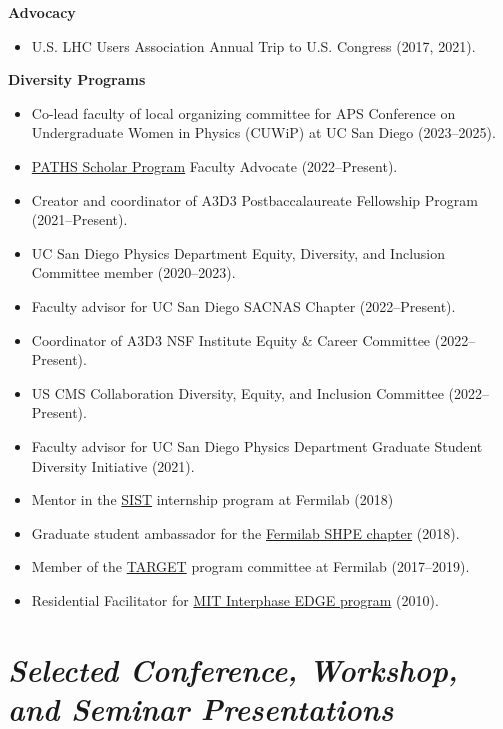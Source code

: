 \documentclass[11pt]{res}
\newcommand{\MarginText}[1]{\section{\textit{#1}}}
\begin{document}
\begin{resume}
  \textbf{Advocacy}
  \begin{itemize}
    \itemsep-0.3em
    \item U.S. LHC Users Association Annual Trip to U.S. Congress ({2017, 2021}).
  \end{itemize}

  \textbf{Diversity Programs}
  \begin{itemize}
    \itemsep-0.3em
    \item Co-lead faculty of local organizing committee for APS Conference on Undergraduate Women in Physics (CUWiP) at UC San Diego (2023--2025).
    \item \href{https://paths.ucsd.edu/index.html}{PATHS Scholar Program} Faculty Advocate (2022--Present).
    \item Creator and coordinator of A3D3 Postbaccalaureate Fellowship Program (2021--Present).
    \item UC San Diego Physics Department Equity, Diversity, and Inclusion Committee member ({2020--2023}).
    \item Faculty advisor for UC San Diego SACNAS Chapter ({2022--Present}).
    \item Coordinator of A3D3 NSF Institute Equity \& Career Committee ({2022--Present}).
    \item US CMS Collaboration Diversity, Equity, and Inclusion Committee ({2022--Present}).
    \item Faculty advisor for UC San Diego Physics Department Graduate Student Diversity Initiative ({2021}).
    \item Mentor in the \href{http://diversity.fnal.gov/sist/}{SIST} internship program at Fermilab ({2018})
    \item Graduate student ambassador for the \href{http://diversity.fnal.gov/fshpe/}{Fermilab SHPE chapter} ({2018}).
    \item Member of the \href{http://diversity.fnal.gov/target/}{TARGET} program committee at Fermilab ({2017--2019}).
    \item Residential Facilitator for \href{http://ome.mit.edu/programs-services/program-overview}{MIT Interphase EDGE program} ({2010}).
  \end{itemize}


  \MarginText{Selected Conference, Workshop, and Seminar Presentations}


\end{resume}
\end{document}
